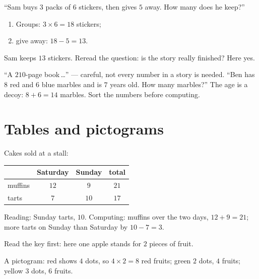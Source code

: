 \begin{example}\label{ex:g2:problems:twostep}
``Sam buys $3$ packs of $6$ stickers, then gives $5$ away. How many
does he keep?''
\begin{enumerate}
  \item Groups: $3 \times 6 = 18$ stickers;
  \item give away: $18 - 5 = 13$.
\end{enumerate}
Sam keeps $13$ stickers. Reread the question: is the story really
finished? Here yes.
\end{example}

\begin{example}\label{ex:g2:problems:extra}
``A $210$-page book\,\dots'' --- careful, not every number in a
story is needed. ``Ben has $8$ red and $6$ blue marbles and is $7$
years old. How many marbles?'' The age is a decoy: $8 + 6 = 14$
marbles. Sort the numbers before computing.
\end{example}

\section{Tables and pictograms}

\begin{example}[A table]\label{ex:g2:problems:table}
Cakes sold at a stall:
\begin{center}
\renewcommand{\arraystretch}{1.3}
\begin{tabular}{l|ccc}
 & Saturday & Sunday & total \\
\hline
muffins & $12$ & $9$ & $21$ \\
tarts & $7$ & $10$ & $17$ \\
\end{tabular}
\end{center}
Reading: Sunday tarts, $10$. Computing: muffins over the two days,
$12 + 9 = 21$; more tarts on Sunday than Saturday by $10 - 7 = 3$.
\end{example}

\begin{example}[A pictogram]\label{ex:g2:problems:pictogram}
Read the key first: here one apple stands for $2$ pieces of fruit.

\begin{omfigure}

{\small A pictogram: red shows $4$ dots, so $4 \times 2 = 8$ red
fruits; green $2$ dots, $4$ fruits; yellow $3$ dots, $6$ fruits.}
\end{omfigure}
\end{example}

